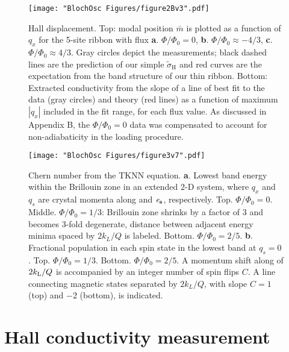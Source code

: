 \begin{figure}
\texttt{[image: "BlochOsc Figures/figure2Bv3".pdf]}
\caption{Hall displacement. Top: modal position $\bar{m}$ is plotted as a function of $q_x$ for the 5-site ribbon with flux \textbf{a}. $\Phi/\Phi_0=0$, \textbf{b}. $\Phi/\Phi_0\approx-4/3$, \textbf{c}. $\Phi/\Phi_0\approx4/3$. Gray circles depict the measurements; black dashed lines are the prediction of our simple $\tilde{\sigma}_\textrm{H}$ and red curves are the expectation from the band structure of our thin ribbon. Bottom: Extracted conductivity from the slope of a line of best fit to the data (gray circles) and theory (red lines) as a function of maximum $|q_x|$ included in the fit range, for each flux value. As discussed in Appendix B, the $\Phi/\Phi_0=0$ data was compensated to account for non-adiabaticity in the loading procedure. }
\label{fig:magnetization}
\end{figure}

\begin{figure}
\texttt{[image: "BlochOsc Figures/figure3v7".pdf]}
\caption{Chern number from the TKNN equation.  \textbf{a}. Lowest band energy within the Brillouin zone in an extended 2-D system, where $q_x$ and $q_s$ are crystal momenta along \ex and $\bf{\mathit{e}_s}$, respectively. Top. $\Phi/\Phi_0=0$. Middle. $\Phi/\Phi_0=1/3$: Brillouin zone shrinks by a factor of $3$ and becomes 3-fold degenerate, distance between adjacent energy minima spaced by $2k_L/Q$ is labeled. Bottom. $\Phi/\Phi_0=2/5$. \textbf{b}.  Fractional population in each spin state in the lowest band at $q_s=0$. Top. $\Phi/\Phi_0=1/3$. Bottom. $\Phi/\Phi_0=2/5$. A momentum shift along \ex of $2k_{\rm{L}}/Q$ is accompanied by an integer number of spin flips $C$. A line connecting magnetic states separated by $2k_L/Q$, with slope $C=1$ (top) and $-2$ (bottom), is indicated. }
\label{fig:Diophantine}
\end{figure}
	
\section{Hall conductivity measurement}

